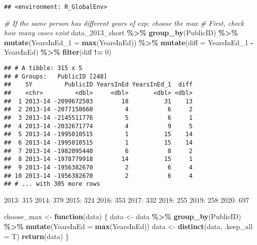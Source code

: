 \documentclass[
]{article}
\newenvironment{Shaded}{\begin{snugshade}}{\end{snugshade}}
\newcommand{\CommentTok}[1]{\textcolor[rgb]{0.56,0.35,0.01}{\textit{#1}}}
\newcommand{\ControlFlowTok}[1]{\textcolor[rgb]{0.13,0.29,0.53}{\textbf{#1}}}
\newcommand{\DataTypeTok}[1]{\textcolor[rgb]{0.13,0.29,0.53}{#1}}
\newcommand{\DecValTok}[1]{\textcolor[rgb]{0.00,0.00,0.81}{#1}}
\newcommand{\KeywordTok}[1]{\textcolor[rgb]{0.13,0.29,0.53}{\textbf{#1}}}
\newcommand{\NormalTok}[1]{#1}
\newcommand{\OperatorTok}[1]{\textcolor[rgb]{0.81,0.36,0.00}{\textbf{#1}}}
\newcommand{\StringTok}[1]{\textcolor[rgb]{0.31,0.60,0.02}{#1}}
\begin{document}
\begin{verbatim}
## <environment: R_GlobalEnv>
\end{verbatim}

\begin{Shaded}
\begin{Highlighting}[]
\CommentTok{\# If the same person has different years of exp: choose the max}
\CommentTok{\# First, check how many cases exist}
\NormalTok{data\_}\DecValTok{2013}\NormalTok{\_short }\OperatorTok{\%\textgreater{}\%}
\StringTok{  }\KeywordTok{group\_by}\NormalTok{(PublicID) }\OperatorTok{\%\textgreater{}\%}
\StringTok{  }\KeywordTok{mutate}\NormalTok{(}\DataTypeTok{YearsInEd\_1 =} \KeywordTok{max}\NormalTok{(YearsInEd)) }\OperatorTok{\%\textgreater{}\%}
\StringTok{  }\KeywordTok{mutate}\NormalTok{(}\DataTypeTok{diff =}\NormalTok{ YearsInEd\_}\DecValTok{1} \OperatorTok{{-}}\StringTok{ }\NormalTok{YearsInEd) }\OperatorTok{\%\textgreater{}\%}
\StringTok{  }\KeywordTok{filter}\NormalTok{(diff }\OperatorTok{!=}\StringTok{ }\DecValTok{0}\NormalTok{)}
\end{Highlighting}
\end{Shaded}

\begin{verbatim}
## # A tibble: 315 x 5
## # Groups:   PublicID [248]
##    SY         PublicID YearsInEd YearsInEd_1  diff
##    <chr>         <dbl>     <dbl>       <dbl> <dbl>
##  1 2013-14 -2099672503        18          31    13
##  2 2013-14 -2077158660         4           6     2
##  3 2013-14 -2145511776         5           6     1
##  4 2013-14 -2032671774         4           9     5
##  5 2013-14 -1995010515         1          15    14
##  6 2013-14 -1995010515         1          15    14
##  7 2013-14 -1982095440         6           8     2
##  8 2013-14 -1978779918        14          15     1
##  9 2013-14 -1956382670         2           6     4
## 10 2013-14 -1956382670         2           6     4
## # ... with 305 more rows
\end{verbatim}

2013: 315 2014: 379 2015: 324 2016: 353 2017: 332 2018: 255 2019: 258
2020: 697

\begin{Shaded}
\begin{Highlighting}[]
\NormalTok{choose\_max \textless{}{-}}\StringTok{ }\ControlFlowTok{function}\NormalTok{(data) \{}
\NormalTok{  data \textless{}{-}}\StringTok{ }\NormalTok{data }\OperatorTok{\%\textgreater{}\%}
\StringTok{    }\KeywordTok{group\_by}\NormalTok{(PublicID) }\OperatorTok{\%\textgreater{}\%}
\StringTok{    }\KeywordTok{mutate}\NormalTok{(}\DataTypeTok{YearsInEd =} \KeywordTok{max}\NormalTok{(YearsInEd)) }
\NormalTok{  data \textless{}{-}}\StringTok{ }\KeywordTok{distinct}\NormalTok{(data, }\DataTypeTok{.keep\_all =}\NormalTok{ T)}
  \KeywordTok{return}\NormalTok{(data)}
\NormalTok{\}}
\end{Highlighting}
\end{Shaded}
\end{document}
